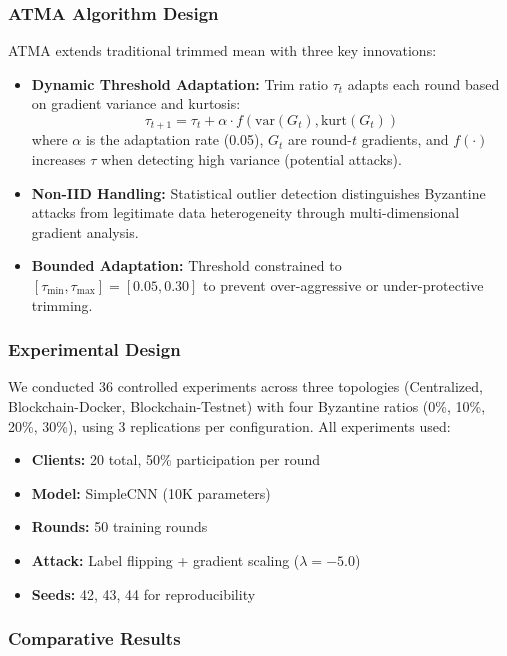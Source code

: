 \documentclass[12pt,a4paper,onecolumn]{article}
\begin{document}
\subsubsection{ATMA Algorithm Design}

ATMA extends traditional trimmed mean with three key innovations:
\begin{itemize}
    \item \textbf{Dynamic Threshold Adaptation:} Trim ratio $\tau_t$ adapts each round based on gradient variance and kurtosis:
    $$\tau_{t+1} = \tau_t + \alpha \cdot f(\text{var}(G_t), \text{kurt}(G_t))$$
    where $\alpha$ is the adaptation rate (0.05), $G_t$ are round-$t$ gradients, and $f(\cdot)$ increases $\tau$ when detecting high variance (potential attacks).
    
    \item \textbf{Non-IID Handling:} Statistical outlier detection distinguishes Byzantine attacks from legitimate data heterogeneity through multi-dimensional gradient analysis.
    
    \item \textbf{Bounded Adaptation:} Threshold constrained to $[\tau_{\min}, \tau_{\max}] = [0.05, 0.30]$ to prevent over-aggressive or under-protective trimming.
\end{itemize}

\subsubsection{Experimental Design}

We conducted 36 controlled experiments across three topologies (Centralized, Blockchain-Docker, Blockchain-Testnet) with four Byzantine ratios (0\%, 10\%, 20\%, 30\%), using 3 replications per configuration. All experiments used:
\begin{itemize}
    \item \textbf{Clients:} 20 total, 50\% participation per round
    \item \textbf{Model:} SimpleCNN (10K parameters)
    \item \textbf{Rounds:} 50 training rounds
    \item \textbf{Attack:} Label flipping + gradient scaling ($\lambda = -5.0$)
    \item \textbf{Seeds:} 42, 43, 44 for reproducibility
\end{itemize}

\subsubsection{Comparative Results}
\end{document}
